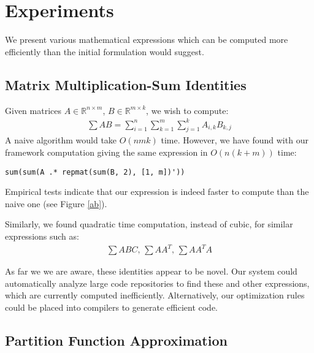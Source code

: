 \section{Experiments}

We present various mathematical expressions which can be computed more efficiently
than the initial formulation would suggest. 

\subsection{Matrix Multiplication-Sum Identities}

Given matrices $A \in \mathbb{R}^{n \times m}$, $B \in \mathbb{R}^{m
  \times k}$, we wish to compute:
\begin{gather*}
\sum AB = \sum_{i = 1}^n \sum_{k = 1}^m \sum_{j = 1}^k A_{i, k} B_{k, j} 
\end{gather*}
A naive algorithm would take $O(nmk)$ time. However, we have found with our framework 
computation giving the same expression in $O(n(k + m))$ time:
\begin{lstlisting}
sum(sum(A .* repmat(sum(B, 2), [1, m])'))
\end{lstlisting}
Empirical tests indicate that our expression is indeed faster to
compute than the naive one (see Figure \ref{ab}).

Similarly, we found quadratic time computation, instead of cubic, for
similar expressions such as: 
\begin{align*}
	\sum ABC\text{, }\sum AA^T\text{, }\sum AA^TA
\end{align*}

As far we we are aware, these identities appear to be novel. Our
system could automatically analyze large code repositories to find
these and other expressions, which are currently computed
inefficiently. Alternatively, our optimization rules could be placed
into compilers to generate efficient code.

\subsection{Partition Function Approximation}

